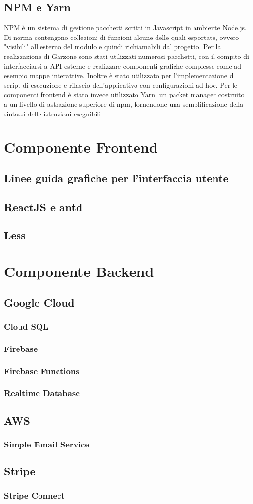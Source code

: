 \subsection{NPM e Yarn}
NPM è un sistema di gestione pacchetti scritti in Javascript in ambiente Node.js. Di norma contengono collezioni di funzioni alcune delle quali esportate, ovvero "visibili" all'esterno del modulo e quindi richiamabili dal progetto. Per la realizzazione di Garzone sono stati utilizzati numerosi pacchetti, con il compito di interfacciarsi a API esterne e realizzare componenti grafiche complesse come ad esempio mappe interattive. Inoltre è stato utilizzato per l'implementazione di script di esecuzione e rilascio dell'applicativo con configurazioni ad hoc. Per le componenti frontend è stato invece utilizzato Yarn, un packet manager costruito a un livello di astrazione superiore di npm, fornendone una semplificazione della sintassi delle istruzioni eseguibili.
\newpage
\section{Componente Frontend}
\subsection{Linee guida grafiche per l'interfaccia utente}
\subsection{ReactJS e antd}
\subsection{Less}
\newpage
\section{Componente Backend}
\subsection{Google Cloud}
\subsubsection{Cloud SQL}
\subsubsection{Firebase}
\subsubsection{Firebase Functions}
\subsubsection{Realtime Database}
\subsection{AWS}
\subsubsection{Simple Email Service}
\subsection{Stripe}
\subsubsection{Stripe Connect}
